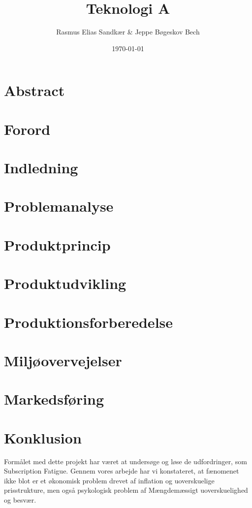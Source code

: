 \documentclass[12pt]{article}
\author{Rasmus Elias Sandkær \& Jeppe Bøgeskov Bech}
\date{\today}
\title{Teknologi A}
\begin{document}
    
    \newpage
    \section*{Abstract}
    
    \newpage
    \section*{Forord}
    
    \newpage
    \tableofcontents
    \newpage
    \section{Indledning}
    

    \newpage
    \section{Problemanalyse}
        

    \newpage
    \section{Produktprincip}
    

    \newpage
    \section{Produktudvikling}
    
    
    \newpage
    \section{Produktionsforberedelse}
    

    \newpage
    \section{Miljøovervejelser}
    

    \newpage
    \section{Markedsføring}
    
    
    \newpage
    \section{Konklusion}
    Formålet med dette projekt har været at undersøge og løse de udfordringer, som Subscription Fatigue. Gennem vores arbejde har vi konstateret, at fænomenet ikke blot er et økonomisk problem drevet af inflation og uoverskuelige prisstrukture, men også psykologisk problem af Mængdemæssigt uoverskuelighed og besvær.
\end{document}
